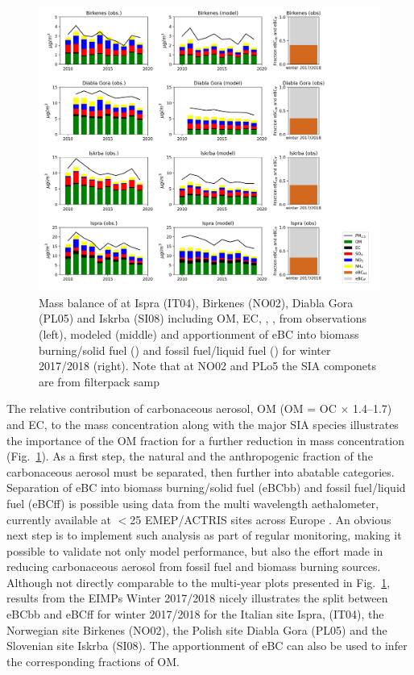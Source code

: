 \begin{figure}
\includegraphics[width=16cm]{FIGS_TRENDS/Composition_4sites.png}
 \caption{
  Mass balance of \pmfine at Ispra (IT04), Birkenes (NO02), Diabla Gora
  (PL05) and Iskrba (SI08) including OM, EC, , ,  from 
  observations (left), modeled (middle) and apportionment of eBC
  into biomass burning/solid fuel (\ebcbb) and fossil fuel/liquid fuel
  (\ebcbb) for winter 2017/2018 (right). Note that at NO02 and PLo5 the SIA componets are from filterpack samp \label{fig:KEX4}
 }
\end{figure}


The relative contribution of carbonaceous aerosol, OM (OM = OC $\times$
1.4--1.7)
 and EC, to the \pmfine mass concentration along with the major
SIA species illustrates the importance of the OM fraction for a further
reduction in \pmfine mass concentration (Fig.~\ref{fig:KEX4}). As a first step,
the natural and the anthropogenic fraction of the carbonaceous aerosol
must be separated, then further into abatable categories. Separation of
eBC into biomass burning/solid fuel (eBCbb) and fossil fuel/liquid fuel
(eBCff) is possible using data from the multi wavelength aethalometer,
currently available at $<$25 EMEP/ACTRIS sites across Europe \citep{Platt20XX}
. An obvious next
step is to implement such analysis as part of regular monitoring,
making it possible to validate not only model performance, but also the
effort made in reducing carbonaceous aerosol from fossil fuel and biomass
burning sources. Although not directly comparable to the multi-year plots
presented in Fig.~\ref{fig:KEX4}, results from the EIMPs Winter 2017/2018 nicely
illustrates the split between eBCbb and eBCff for winter 2017/2018 for
the Italian site Ispra, (IT04), the Norwegian site Birkenes (NO02), the
Polish site Diabla Gora (PL05) and the Slovenian site Iskrba (SI08). The
apportionment of eBC can also be used to infer the corresponding fractions
of OM.

